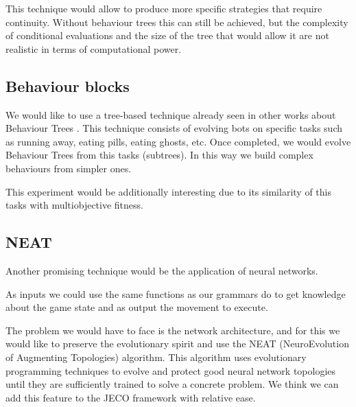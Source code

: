 This technique would allow to produce more specific strategies that require continuity. Without behaviour trees this can still be achieved, but the complexity of conditional evaluations and the size of the tree that would allow it are not realistic in terms of computational power.

\subsection{Behaviour blocks}
We would like to use a tree-based technique already seen in other works about Behaviour Trees \cite{lim2010evolving} \cite{perez2011evolving}. This technique consists of evolving bots on specific tasks such as running away, eating pills, eating ghosts, etc. Once completed, we would evolve Behaviour Trees from this tasks (subtrees). In this way we build complex behaviours from simpler ones.

This experiment would be additionally interesting due to its similarity of this tasks with multiobjective fitness.

\subsection{NEAT}

Another promising technique would be the application of neural networks.

As inputs we could use the same functions as our grammars do to get knowledge about the game state and as output the movement to execute.

The problem we would have to face is the network architecture, and for this we would like to preserve the evolutionary spirit and use the NEAT (NeuroEvolution of Augmenting Topologies) algorithm. This algorithm uses evolutionary programming techniques to evolve and protect good neural network topologies until they are sufficiently trained to solve a concrete problem. We think we can add this feature to the JECO framework with relative ease.
